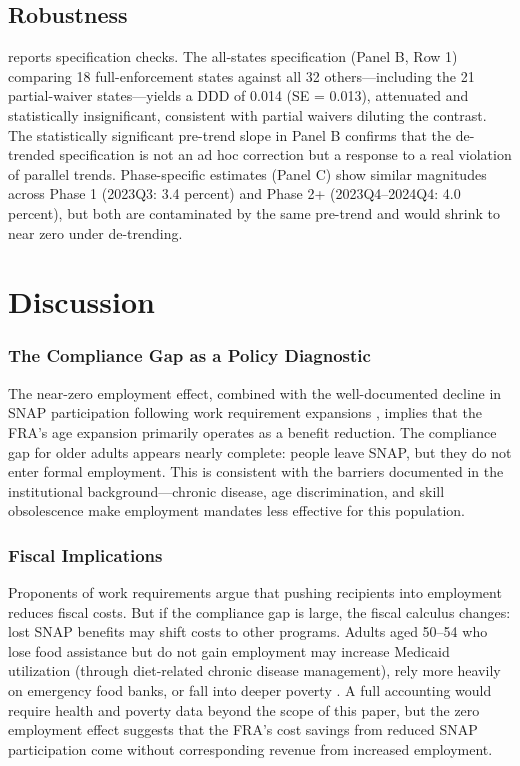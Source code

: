 \documentclass[12pt]{article}
\begin{document}
\subsection{Robustness}

 reports specification checks. The all-states specification (Panel B, Row 1) comparing 18 full-enforcement states against all 32 others---including the 21 partial-waiver states---yields a DDD of 0.014 (SE = 0.013), attenuated and statistically insignificant, consistent with partial waivers diluting the contrast. The statistically significant pre-trend slope in Panel B confirms that the de-trended specification is not an ad hoc correction but a response to a real violation of parallel trends. Phase-specific estimates (Panel C) show similar magnitudes across Phase 1 (2023Q3: 3.4 percent) and Phase 2+ (2023Q4--2024Q4: 4.0 percent), but both are contaminated by the same pre-trend and would shrink to near zero under de-trending.




\section{Discussion}
\label{sec:discussion}

\subsubsection*{The Compliance Gap as a Policy Diagnostic} The near-zero employment effect, combined with the well-documented decline in SNAP participation following work requirement expansions \citep{gray2023losing, harris2023work}, implies that the FRA's age expansion primarily operates as a benefit reduction. The compliance gap for older adults appears nearly complete: people leave SNAP, but they do not enter formal employment. This is consistent with the barriers documented in the institutional background---chronic disease, age discrimination, and skill obsolescence make employment mandates less effective for this population.

\subsubsection*{Fiscal Implications} Proponents of work requirements argue that pushing recipients into employment reduces fiscal costs. But if the compliance gap is large, the fiscal calculus changes: lost SNAP benefits may shift costs to other programs. Adults aged 50--54 who lose food assistance but do not gain employment may increase Medicaid utilization (through diet-related chronic disease management), rely more heavily on emergency food banks, or fall into deeper poverty \citep{gundersen2011food}. A full accounting would require health and poverty data beyond the scope of this paper, but the zero employment effect suggests that the FRA's cost savings from reduced SNAP participation come without corresponding revenue from increased employment.
\end{document}
